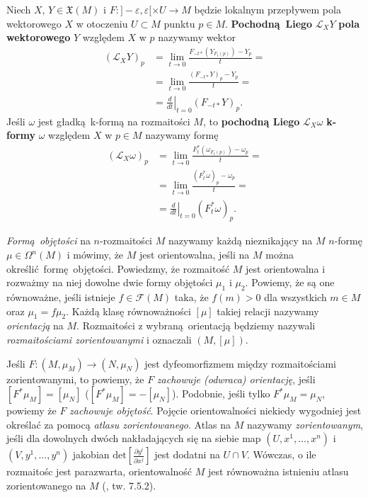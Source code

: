 Niech \(X,\,Y\in\mathfrak{X}(M)\) i \(F:]-\varepsilon, \varepsilon[\times U\rightarrow M\) będzie lokalnym przepływem pola wektorowego \(X\) w otoczeniu \(U\subset M\) punktu \(p\in M\). \textbf{Pochodną Liego} \(\mathcal{L}_X Y\) \textbf{pola wektorowego} \(Y\) względem \(X\) w \(p\) nazywamy wektor
\begin{equation}\label{eq:lie_vector}
\begin{split}
(\mathcal{L}_X Y)_p &= \lim_{t\to 0} \frac{F_{-t\ast}(Y_{F_t(p)})-Y_p}{t} =\\
                    &= \lim_{t\to 0} \frac{(F_{-t\ast}Y)_p - Y_p}{t} =\\
                    &= \left.\frac{d}{dt}\right|_{t = 0}(F_{-t\ast}Y)_p.
\end{split}
\end{equation} 
Jeśli \(\omega\) jest gładką k-formą na rozmaitości \(M\), to \textbf{pochodną Liego} \(\mathcal{L}_X \omega\) \textbf{k-formy} \(\omega\) względem \(X\) w \(p\in M\) nazywamy formę
\begin{equation}\label{eq:lie_form}
\begin{split}
(\mathcal{L}_X \omega)_p &= \lim_{t\to 0}\frac{F_t^{\ast}(\omega_{F_t(p)})-\omega_p}{t} =\\
						 &= \lim_{t\to 0}\frac{(F_t^{\ast}\omega)_p - \omega_p}{t} =\\
						 &= \left.\frac{d}{dt}\right|_{t=0}(F_t^{\ast}\omega)_p.
\end{split}
\end{equation}

\emph{Formą objętości} na \(n\)-rozmaitości \(M\) nazywamy każdą nieznikający na \(M\) \(n\)-formę \(\mu\in\Omega^n(M)\) i mówimy, że \(M\) jest orientowalna, jeśli na \(M\) można określić formę objętości.
Powiedzmy, że rozmaitość \(M\) jest orientowalna i rozważmy na niej dowolne dwie formy objętości \(\mu_1\) i \(\mu_2\). Powiemy, że są one równoważne, jeśli istnieje \(f\in\mathcal{F}(M)\) taka, że \(f(m)>0\) dla wszystkich \(m\in M\) oraz \(\mu_1 = f \mu_2\). Każdą klasę równoważności \(\left[\mu\right]\) takiej relacji nazywamy \emph{orientacją} na \(M\).   
Rozmaitości z wybraną orientacją będziemy nazywali \emph{rozmaitościami zorientowanymi} i oznaczali \((M, [\mu])\). 

Jeśli \(F: (M, \mu_M)\to(N, \mu_N)\) jest dyfeomorfizmem między rozmaitościami zorientowanymi, to powiemy, że \(F\) \emph{zachowuje (odwraca) orientację}, jeśli \(\left[F^\ast \mu_M\right] = \left[\mu_N\right]\) (\(\left[F^\ast \mu_M\right] = -\left[\mu_N\right]\)). Podobnie, jeśli tylko \(F^\ast \mu_M = \mu_N\), powiemy że \(F\) \emph{zachowuje objętość}. Pojęcie orientowalności niekiedy wygodniej jest określać za pomocą \emph{atlasu zorientowanego}. Atlas na \(M\) nazywamy \emph{zorientowanym}, jeśli dla dowolnych dwóch nakładających się na siebie map \((U, x^1, \dots, x^n)\) i \((V, y^1, \dots, y^n)\) jakobian \(\mathrm{det}\left[\frac{\partial y^i}{\partial x^j}\right]\) jest dodatni na \(U\cap V\). Wówczas, o ile rozmaitośc jest parazwarta, orientowalność \(M\) jest równoważna istnieniu atlasu zorientowanego na \(M\) (\cite{marsden}, tw. 7.5.2).

